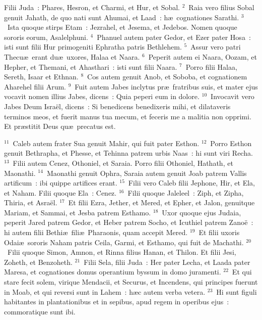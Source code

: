 \bchapter
\lettrine[lines=3,image=true,loversize=0.05,lraise=-0.03]{F}{}ilii Juda~: Phares, Hesron, et Charmi, et Hur, et Sobal.
${}^{2}$~Raia vero filius Sobal genuit Jahath, de quo nati sunt Ahumai, et Laad~: h\ae\ cognationes Sarathi.
${}^{3}$~Ista quoque stirps Etam~: Jezrahel, et Jesema, et Jedebos. Nomen quoque sororis eorum, Asalelphuni.
${}^{4}$~Phanuel autem pater Gedor, et Ezer pater Hosa~: isti sunt filii Hur primogeniti Ephratha patris Bethlehem.
${}^{5}$~Assur vero patri Thecu\ae\ erant du\ae\ uxores, Halaa et Naara.
${}^{6}$~Peperit autem ei Naara, Oozam, et Hepher, et Themani, et Ahasthari~: isti sunt filii Naara.
${}^{7}$~Porro filii Halaa, Sereth, Isaar et Ethnan.
${}^{8}$~Cos autem genuit Anob, et Soboba, et cognationem Aharehel filii Arum.
${}^{9}$~Fuit autem Jabes inclytus pr\ae\ fratribus suis, et mater ejus vocavit nomen illius Jabes, dicens~: Quia peperi eum in dolore.
${}^{10}$~Invocavit vero Jabes Deum Isra\"el, dicens~: Si benedicens benedixeris mihi, et dilataveris terminos meos, et fuerit manus tua mecum, et feceris me a malitia non opprimi. Et pr\ae stitit Deus qu\ae\ precatus est.


${}^{11}$~Caleb autem frater Sua genuit Mahir, qui fuit pater Esthon.
${}^{12}$~Porro Esthon genuit Bethrapha, et Phesse, et Tehinna patrem urbis Naas~: hi sunt viri Recha.
${}^{13}$~Filii autem Cenez, Othoniel, et Saraia. Porro filii Othoniel, Hathath, et Maonathi.
${}^{14}$~Maonathi genuit Ophra, Saraia autem genuit Joab patrem Vallis artificum~: ibi quippe artifices erant.
${}^{15}$~Filii vero Caleb filii Jephone, Hir, et Ela, et Naham. Filii quoque Ela~: Cenez.
${}^{16}$~Filii quoque Jaleleel~: Ziph, et Zipha, Thiria, et Asra\"el.
${}^{17}$~Et filii Ezra, Jether, et Mered, et Epher, et Jalon, genuitque Mariam, et Sammai, et Jesba patrem Esthamo.
${}^{18}$~Uxor quoque ejus Judaia, peperit Jared patrem Gedor, et Heber patrem Socho, et Icuthiel patrem Zano\"e~: hi autem filii Bethi\ae\ fili\ae\ Pharaonis, quam accepit Mered.
${}^{19}$~Et filii uxoris Odai\ae\ sororis Naham patris Ceila, Garmi, et Esthamo, qui fuit de Machathi.
${}^{20}$~Filii quoque Simon, Amnon, et Rinna filius Hanan, et Thilon. Et filii Jesi, Zoheth, et Benzoheth.
${}^{21}$~Filii Sela, filii Juda~: Her pater Lecha, et Laada pater Maresa, et cognationes domus operantium byssum in domo juramenti.
${}^{22}$~Et qui stare fecit solem, virique Mendacii, et Securus, et Incendens, qui principes fuerunt in Moab, et qui reversi sunt in Lahem~: h\ae c autem verba vetera.
${}^{23}$~Hi sunt figuli habitantes in plantationibus et in sepibus, apud regem in operibus ejus~: commoratique sunt ibi.


